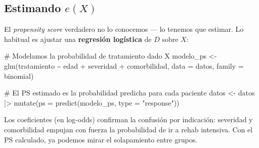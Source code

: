 \documentclass[
  letterpaper,
  DIV=11,
  numbers=noendperiod,
  oneside]{scrreprt}
\newenvironment{Shaded}{\begin{snugshade}}{\end{snugshade}}
\newcommand{\AttributeTok}[1]{\textcolor[rgb]{0.40,0.45,0.13}{#1}}
\newcommand{\CommentTok}[1]{\textcolor[rgb]{0.37,0.37,0.37}{#1}}
\newcommand{\FunctionTok}[1]{\textcolor[rgb]{0.28,0.35,0.67}{#1}}
\newcommand{\NormalTok}[1]{\textcolor[rgb]{0.00,0.23,0.31}{#1}}
\newcommand{\OtherTok}[1]{\textcolor[rgb]{0.00,0.23,0.31}{#1}}
\newcommand{\SpecialCharTok}[1]{\textcolor[rgb]{0.37,0.37,0.37}{#1}}
\newcommand{\StringTok}[1]{\textcolor[rgb]{0.13,0.47,0.30}{#1}}
\begin{document}
\hypertarget{estimando-ex}{%
\subsection{\texorpdfstring{Estimando
\(e(X)\)}{Estimando e(X)}}\label{estimando-ex}}

El \emph{propensity score} verdadero no lo conocemos --- lo tenemos que
estimar. Lo habitual es ajustar una \textbf{regresión logística} de
\(D\) sobre \(X\):

\begin{Shaded}
\begin{Highlighting}[]
\CommentTok{\# Modelamos la probabilidad de tratamiento dado X}
\NormalTok{modelo\_ps }\OtherTok{\textless{}{-}} \FunctionTok{glm}\NormalTok{(tratamiento }\SpecialCharTok{\textasciitilde{}}\NormalTok{ edad }\SpecialCharTok{+}\NormalTok{ severidad }\SpecialCharTok{+}\NormalTok{ comorbilidad,}
                 \AttributeTok{data   =}\NormalTok{ datos,}
                 \AttributeTok{family =}\NormalTok{ binomial)}

\CommentTok{\# El PS estimado es la probabilidad predicha para cada paciente}
\NormalTok{datos }\OtherTok{\textless{}{-}}\NormalTok{ datos }\SpecialCharTok{|\textgreater{}}
  \FunctionTok{mutate}\NormalTok{(}\AttributeTok{ps =} \FunctionTok{predict}\NormalTok{(modelo\_ps, }\AttributeTok{type =} \StringTok{"response"}\NormalTok{))}
\end{Highlighting}
\end{Shaded}

Los coeficientes (en log-odds) confirman la confusión por indicación:
severidad y comorbilidad empujan con fuerza la probabilidad de ir a
rehab intensiva. Con el PS calculado, ya podemos mirar el solapamiento
entre grupos.
\end{document}
